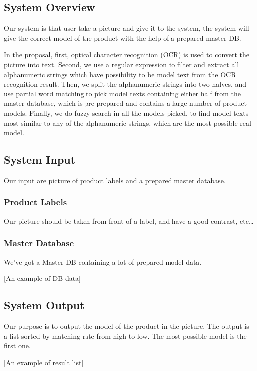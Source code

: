 \documentclass[technicalreport]{ieicej}
\begin{document}
    \subsection{System Overview}
        Our system is that user take a picture and give it to the system, the system will give the correct model of the product with the help of a prepared master DB.

        In the proposal, first, optical character recognition (OCR) is used to convert the picture into text. Second, we use a regular expression to filter and extract all alphanumeric strings which have possibility to be model text from the OCR recognition result. Then, we split the alphanumeric strings into two halves, and use partial word matching to pick model texts containing either half from the master database, which is pre-prepared and contains a large number of product models. Finally, we do fuzzy search in all the models picked, to find model texts most similar to any of the alphanumeric strings, which are the most possible real model. 
        
    \subsection{System Input}
    \label{sec:algorithm.ocrregex}
        Our input are picture of product labels and a prepared master database.

        \subsubsection{Product Labels}
        Our picture should be taken from front of a label, and have a good contrast, etc\dots

        \subsubsection{Master Database}
        We've got a Master DB containing a lot of prepared model data.

        [An example of DB data]
    
    \subsection{System Output}
        Our purpose is to output the model of the product in the picture. The output is a list sorted by matching rate from high to low. The most possible model is the first one.

        [An example of result list]
\end{document}
